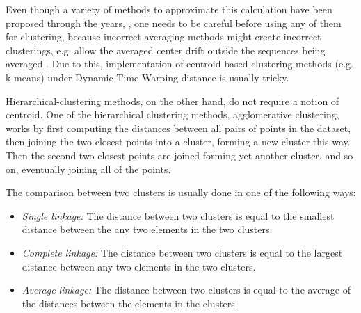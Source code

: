 \documentclass[parskip]{cs4rep}
\begin{document}
Even though a variety of methods to approximate this calculation have been proposed through the years, \cite{Gupta:1996tw,Niennattrakul:2009ep,Petitjean:2011bq,Petitjean:2012bp}, one needs to be careful before using any of them for clustering, because incorrect averaging methods might create incorrect clusterings, e.g. allow the averaged center drift outside the sequences being averaged \cite{Niennattrakul:2007wv}. Due to this, implementation of centroid-based clustering methods (e.g. k-means) under Dynamic Time Warping distance is usually tricky.

Hierarchical-clustering methods, on the other hand, do not require a notion of centroid. One of the hierarchical clustering methods, agglomerative clustering, works by first computing the distances between all pairs of points in the dataset, then joining the two closest points into a cluster, forming a new cluster this way. Then the second two closest points are joined forming yet another cluster, and so on, eventually joining all of the points. 

The comparison between two clusters is usually done in one of the following ways:

\begin{itemize}
   \item \emph{Single linkage:} The distance between two clusters is equal to the smallest distance between the any two elements in the two clusters.
   \item \emph{Complete linkage:} The distance between two clusters is equal to the largest distance between any two elements in the two clusters.
   \item \emph{Average linkage:} The distance between two clusters is equal to the average of the distances between the elements in the clusters.
\end{itemize}
\end{document}
